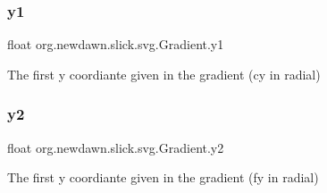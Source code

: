 \subsubsection{\texorpdfstring{y1}{y1}}
{\footnotesize\ttfamily float org.\+newdawn.\+slick.\+svg.\+Gradient.\+y1\hspace{0.3cm}{\ttfamily [private]}}

The first y coordiante given in the gradient (cy in radial) \mbox{\label{classorg_1_1newdawn_1_1slick_1_1svg_1_1_gradient_a75141315026ebdfdbb8d222a8c7358c6}} 
\subsubsection{\texorpdfstring{y2}{y2}}
{\footnotesize\ttfamily float org.\+newdawn.\+slick.\+svg.\+Gradient.\+y2\hspace{0.3cm}{\ttfamily [private]}}

The first y coordiante given in the gradient (fy in radial) 